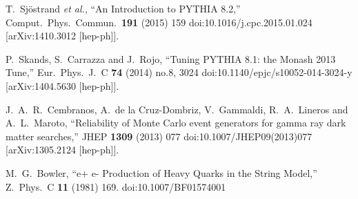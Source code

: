 \documentclass[aps,preprint,floatfix,nofootinbib,showpacs]{revtex4-1}
\begin{document}
\begin{thebibliography}{99}
  T.~Sjöstrand {\it et al.},
  ``An Introduction to PYTHIA 8.2,''
  Comput.\ Phys.\ Commun.\  {\bf 191} (2015) 159
  doi:10.1016/j.cpc.2015.01.024
  [arXiv:1410.3012 [hep-ph]].
  
  P.~Skands, S.~Carrazza and J.~Rojo,
  ``Tuning PYTHIA 8.1: the Monash 2013 Tune,''
  Eur.\ Phys.\ J.\ C {\bf 74} (2014) no.8,  3024
  doi:10.1140/epjc/s10052-014-3024-y
  [arXiv:1404.5630 [hep-ph]].
  
  J.~A.~R.~Cembranos, A.~de la Cruz-Dombriz, V.~Gammaldi, R.~A.~Lineros and A.~L.~Maroto,
  ``Reliability of Monte Carlo event generators for gamma ray dark matter searches,''
  JHEP {\bf 1309} (2013) 077
  doi:10.1007/JHEP09(2013)077
  [arXiv:1305.2124 [hep-ph]].

  M.~G.~Bowler,
  ``e+ e- Production of Heavy Quarks in the String Model,''
  Z.\ Phys.\ C {\bf 11} (1981) 169.
  doi:10.1007/BF01574001
 
\end{thebibliography}
\end{document}
